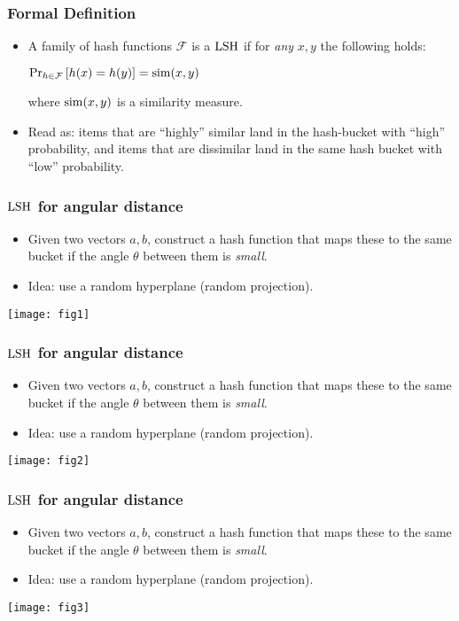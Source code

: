\documentclass{beamer}
\begin{document}
\begin{frame}
\frametitle{Formal Definition}
\begin{itemize}
\item A family of hash functions $\mathcal{F}$ is a $\mathrm{LSH}$ if for \textit{any} $x, y$ the following holds:
\begin{center}
$\Pr_{h\in\mathcal{F}}\left[h(x)=h(y)\right] = \mathrm{sim}(x, y)$
\end{center}
where $\mathrm{sim}(x, y)$ is a similarity measure.
\item Read as: items that are ``highly'' similar land in the  hash-bucket with ``high'' probability, and items that are dissimilar land in the same hash bucket with ``low'' probability.
\end{itemize}
\end{frame}

\begin{frame}
\frametitle{$\mathrm{LSH}$ for angular distance}
\begin{itemize}
\item Given two vectors $a, b$, construct a hash function that maps these to the same bucket if the angle $\theta$ between them is {\em small}.
\item Idea: use a random hyperplane (random projection).
\end{itemize}
\begin{center}
\texttt{[image: fig1]}
\end{center}
\end{frame}


\begin{frame}
\frametitle{$\mathrm{LSH}$ for angular distance}
\begin{itemize}
\item Given two vectors $a, b$, construct a hash function that maps these to the same bucket if the angle $\theta$ between them is {\em small}.
\item Idea: use a random hyperplane (random projection).
\end{itemize}
\begin{center}
\texttt{[image: fig2]}
\end{center}
\end{frame}

\begin{frame}
\frametitle{$\mathrm{LSH}$ for angular distance}
\begin{itemize}
\item Given two vectors $a, b$, construct a hash function that maps these to the same bucket if the angle $\theta$ between them is {\em small}.
\item Idea: use a random hyperplane (random projection).
\end{itemize}
\begin{center}
\texttt{[image: fig3]}
\end{center}
\end{frame}
\end{document}

